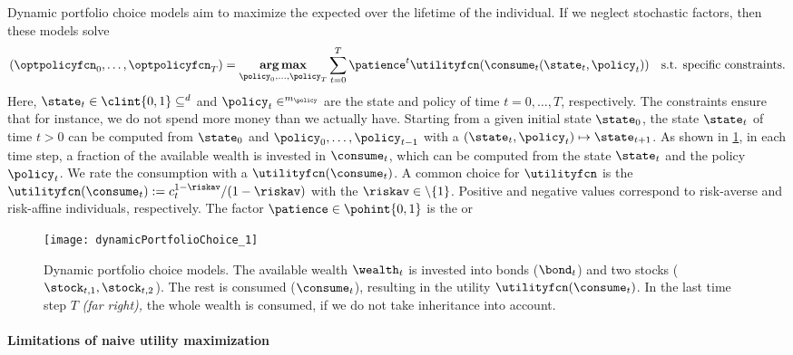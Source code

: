 Dynamic portfolio choice models aim to maximize the expected
 over the lifetime of the individual.
If we neglect stochastic factors, then these models solve
\begin{equation}
  \label{eq:utilityMaximization}
  (\optpolicyfcn_0, \dotsc, \optpolicyfcn_T)
  = \vecargmax_{\policy_0, \dotsc, \policy_T}
  \sum_{t=0}^T \patience^t \utilityfcn(\consume_t(\state_t, \policy_t))
  \quad\text{s.t. specific constraints.}
\end{equation}
Here, $\state_t \in \clint{\*0, \*1} \subset \real^d$ and
$\policy_t \in \real^{m_{\policy}}$
are the state and policy of time $t = 0, \dotsc, T$, respectively.
The constraints ensure that for instance, we do not spend more money
than we actually have.
Starting from a given initial state $\state_0$,
the state $\state_t$ of time $t > 0$ can be computed from
$\state_0$ and $\policy_0, \dotsc, \policy_{t-1}$ with a
 $(\state_t, \policy_t) \mapsto \state_{t+1}$.
As shown in \cref{fig:dynamicPortfolioChoice},
in each time step, a fraction of the available wealth
is invested in  $\consume_t$,
which can be computed from the state $\state_t$ and the policy $\policy_t$.
We rate the consumption with a 
$\utilityfcn(\consume_t)$.
A common choice for $\utilityfcn$ is the 
$\utilityfcn(\consume_t) := c_t^{1-\riskav}/(1-\riskav)$
with the  $\riskav \in \real \setminus \{1\}$.
Positive and negative values correspond to risk-averse and risk-affine
individuals, respectively.
The factor $\patience \in \pohint{0, 1}$ is the 
or 

\begin{SCfigure}
  \texttt{[image: dynamicPortfolioChoice\_1]}%
  \caption[Dynamic portfolio choice models]{%
    Dynamic portfolio choice models.
    The available wealth $\wealth_t$ is invested
    into bonds ($\bond_t$) and two stocks ($\stock_{t,1}, \stock_{t,2}$).
    The rest is consumed ($\consume_t$), resulting in the utility
    $\utilityfcn(\consume_t)$.
    In the last time step $T$ \emph{(far right),}
    the whole wealth is consumed, if we do not take inheritance
    into account.%
  }%
  \label{fig:dynamicPortfolioChoice}%
\end{SCfigure}

\paragraph{Limitations of naive utility maximization}


